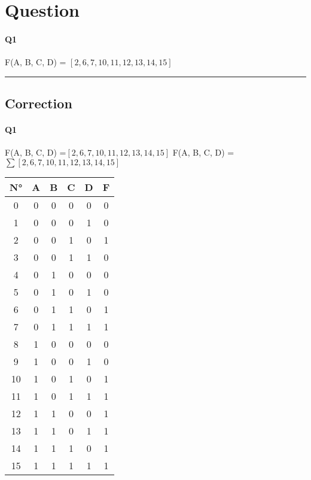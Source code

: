 
\section{Question}

\paragraph{Q1}


F(A, B, C, D) = $[2, 6, 7, 10, 11, 12, 13, 14, 15]$

\hrule width 1\linewidth\pagebreak
\subsection{Correction}

\paragraph{Q1}

F(A, B, C, D) =$[2, 6, 7, 10, 11, 12, 13, 14, 15]$
F(A, B, C, D) =$ \sum [2, 6, 7, 10, 11, 12, 13, 14, 15] $ 

        \begin{tabular}{|c|c|c|c|c||c|}
    \toprule
        N° & A & B & C & D & F\\ \midrule0 & 0 & 0 & 0 & 0 & 0\\1 & 0 & 0 & 0 & 1 & 0\\2 & 0 & 0 & 1 & 0 & 1\\3 & 0 & 0 & 1 & 1 & 0\\\midrule4 & 0 & 1 & 0 & 0 & 0\\5 & 0 & 1 & 0 & 1 & 0\\6 & 0 & 1 & 1 & 0 & 1\\7 & 0 & 1 & 1 & 1 & 1\\\midrule8 & 1 & 0 & 0 & 0 & 0\\9 & 1 & 0 & 0 & 1 & 0\\10 & 1 & 0 & 1 & 0 & 1\\11 & 1 & 0 & 1 & 1 & 1\\\midrule12 & 1 & 1 & 0 & 0 & 1\\13 & 1 & 1 & 0 & 1 & 1\\14 & 1 & 1 & 1 & 0 & 1\\15 & 1 & 1 & 1 & 1 & 1\\\bottomrule
        \end{tabular}
        
